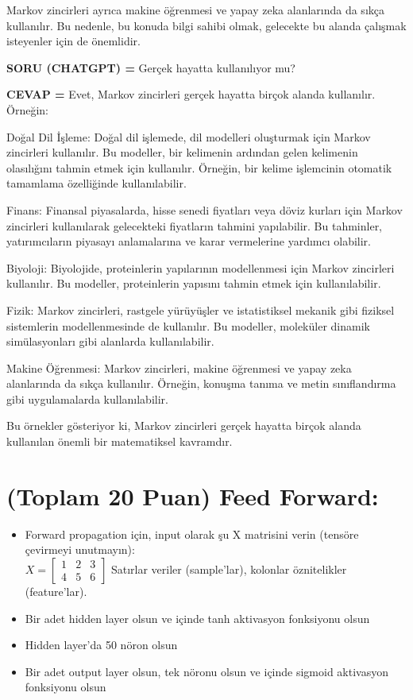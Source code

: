 \documentclass[11pt]{article}
\begin{document}
Markov zincirleri ayrıca makine öğrenmesi ve yapay zeka alanlarında da sıkça kullanılır. Bu nedenle, bu konuda bilgi sahibi olmak, gelecekte bu alanda çalışmak isteyenler için de önemlidir.


\textbf{SORU (CHATGPT) =} Gerçek hayatta kullanılıyor mu?

\textbf{CEVAP =} Evet, Markov zincirleri gerçek hayatta birçok alanda kullanılır. Örneğin:

Doğal Dil İşleme: Doğal dil işlemede, dil modelleri oluşturmak için Markov zincirleri kullanılır. Bu modeller, bir kelimenin ardından gelen kelimenin olasılığını tahmin etmek için kullanılır. Örneğin, bir kelime işlemcinin otomatik tamamlama özelliğinde kullanılabilir.

Finans: Finansal piyasalarda, hisse senedi fiyatları veya döviz kurları için Markov zincirleri kullanılarak gelecekteki fiyatların tahmini yapılabilir. Bu tahminler, yatırımcıların piyasayı anlamalarına ve karar vermelerine yardımcı olabilir.

Biyoloji: Biyolojide, proteinlerin yapılarının modellenmesi için Markov zincirleri kullanılır. Bu modeller, proteinlerin yapısını tahmin etmek için kullanılabilir.

Fizik: Markov zincirleri, rastgele yürüyüşler ve istatistiksel mekanik gibi fiziksel sistemlerin modellenmesinde de kullanılır. Bu modeller, moleküler dinamik simülasyonları gibi alanlarda kullanılabilir.

Makine Öğrenmesi: Markov zincirleri, makine öğrenmesi ve yapay zeka alanlarında da sıkça kullanılır. Örneğin, konuşma tanıma ve metin sınıflandırma gibi uygulamalarda kullanılabilir.

Bu örnekler gösteriyor ki, Markov zincirleri gerçek hayatta birçok alanda kullanılan önemli bir matematiksel kavramdır.


\section{(Toplam 20 Puan) Feed Forward:}
 
\begin{itemize}
    \item Forward propagation için, input olarak şu X matrisini verin (tensöre çevirmeyi unutmayın):\\
    $X = \begin{bmatrix}
        1 & 2 & 3\\
        4 & 5 & 6
        \end{bmatrix}$
    Satırlar veriler (sample'lar), kolonlar öznitelikler (feature'lar).
    \item Bir adet hidden layer olsun ve içinde tanh aktivasyon fonksiyonu olsun
    \item Hidden layer'da 50 nöron olsun
    \item Bir adet output layer olsun, tek nöronu olsun ve içinde sigmoid aktivasyon fonksiyonu olsun
\end{itemize}
\end{document}
